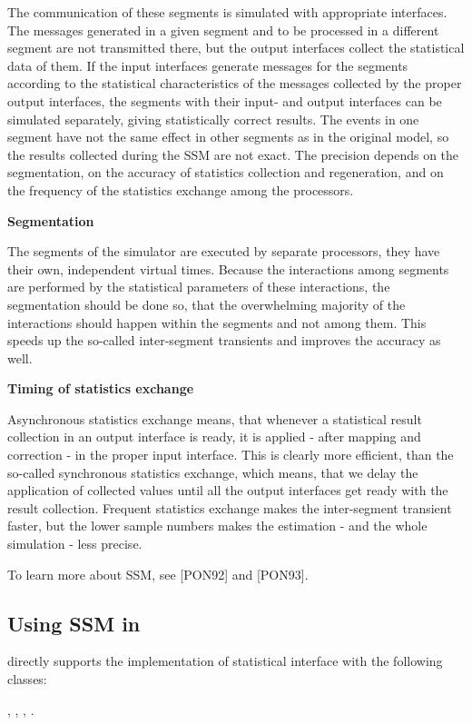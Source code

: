 The communication of these segments is simulated with appropriate
interfaces. The messages generated in a given segment and to be
processed in a different segment are not transmitted there, but the
output interfaces collect the statistical data of them.  If the input
interfaces generate messages for the segments according to the
statistical characteristics of the messages collected by the proper
output interfaces, the segments with their input- and output
interfaces can be simulated separately, giving statistically correct
results. The events in one segment have not the same effect in other
segments as in the original model, so the results collected during the
SSM are not exact. The precision depends on the
segmentation, on the accuracy of statistics collection and
regeneration, and on the frequency of the statistics exchange among
the processors.


\textbf{Segmentation}


The segments of the simulator are
executed by separate processors, they have their own, independent
virtual times. Because the interactions among segments are performed
by the statistical parameters of these interactions, the segmentation
should be done so, that the overwhelming majority of the interactions
should happen within the segments and not among them. This speeds up
the so-called inter-segment transients
and improves the accuracy as well.


\textbf{Timing of statistics exchange}


Asynchronous statistics exchange means, that whenever a statistical result collection in an
output interface is ready, it is applied - after mapping and
correction - in the proper input interface.  This is clearly more
efficient, than the so-called synchronous statistics
exchange, which means, that we
delay the application of collected values until all the output
interfaces get ready with the result collection. Frequent statistics
exchange makes the inter-segment transient faster, but the lower
sample numbers makes the estimation - and the whole simulation - less
precise.


To learn more about SSM, see [PON92] and [PON93].





\subsection{Using SSM in {\opp}}

{\opp} directly supports the implementation of statistical
interface with the following classes:

, , , .


